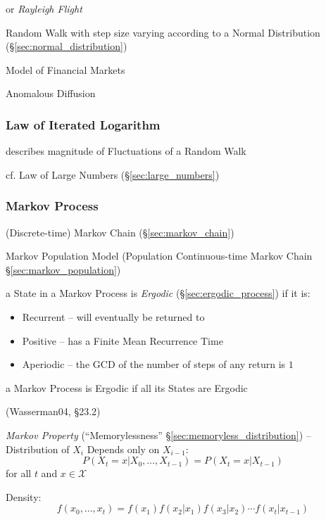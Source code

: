 or \emph{Rayleigh Flight}

Random Walk with step size varying according to a Normal Distribution
(\S\ref{sec:normal_distribution})

Model of Financial Markets

Anomalous Diffusion



\subsubsection{Law of Iterated Logarithm}\label{sec:iterated_logarithm}

describes magnitude of Fluctuations of a Random Walk

cf. Law of Large Numbers (\S\ref{sec:large_numbers})



\subsubsection{Markov Process}\label{sec:markov_process}


\fist (Discrete-time) Markov Chain (\S\ref{sec:markov_chain})

\fist Markov Population Model (Population Continuous-time Markov Chain
\S\ref{sec:markov_population})

a State in a Markov Process is \emph{Ergodic} (\S\ref{sec:ergodic_process}) if
it is:
\begin{itemize}
  \item Recurrent -- will eventually be returned to
  \item Positive -- has a Finite Mean Recurrence Time
  \item Aperiodic -- the GCD of the number of steps of any return is $1$
\end{itemize}
a Markov Process is Ergodic if all its States are Ergodic


(Wasserman04, \S23.2)

\emph{Markov Property} (``Memorylessness'' \S\ref{sec:memoryless_distribution})
-- Distribution of $X_i$ Depends only on $X_{i-1}$:
\[
  P(X_t = x | X_0, \ldots, X_{t-1}) = P(X_t = x | X_{t-1})
\]
for all $t$ and $x \in \mathcal{X}$

Density:
\[
  f(x_0, \ldots, x_t) = f(x_1)f(x_2|x_1)f(x_3|x_2) \cdots f(x_t|x_{t-1})
\]

